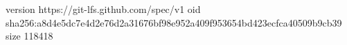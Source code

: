 version https://git-lfs.github.com/spec/v1
oid sha256:a8d4e5dc7e4d2e76d2a31676bf98e952a409f953654bd423ecfca40509b9cb39
size 118418
